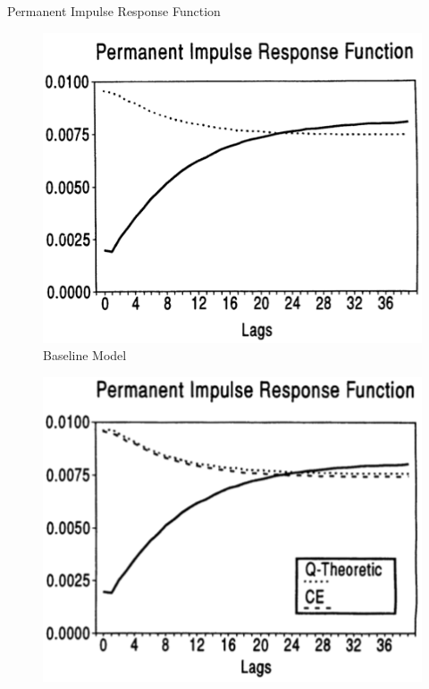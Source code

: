 \documentclass[10pt]{beamer}
\begin{document}
\begin{frame}{Permanent Impulse Response Function}
    \begin{minipage}{0.33\textwidth}
        \begin{figure}
            \centering
            \includegraphics[width=\linewidth]{figures/Base_per_IRF.png}
            \caption{Baseline Model}
        \end{figure}
    \end{minipage}%
    \begin{minipage}{0.33\textwidth}
        \begin{figure}
            \centering
            \includegraphics[width=\linewidth]{figures/K_per_IRF.png}

\end{figure}
\end{minipage}
\end{frame}
\end{document}
